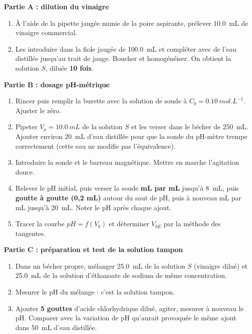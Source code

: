 \documentclass[11pt]{article}
\begin{document}
\textbf{Partie A : dilution du vinaigre}

\begin{enumerate}
\item À l'aide de la pipette jaugée munie de la poire aspirante, prélever \SI{10,0}{mL} de vinaigre commercial.
\item Les introduire dans la fiole jaugée de \SI{100,0}{mL} et compléter avec de l'eau distillée jusqu'au trait de jauge. Boucher et homogénéiser. On obtient la solution $S$, diluée \textbf{10 fois}.
\end{enumerate}

\textbf{Partie B : dosage pH-métrique}

\begin{enumerate}
\item Rincer puis remplir la burette avec la solution de soude à $C_b = \SI{0,10}{mol.L^{-1}}$. Ajuster le zéro.
\item Pipeter $V_a = \SI{10,0}{mL}$ de la solution $S$ et les verser dans le bécher de \SI{250}{mL}. Ajouter environ \SI{20}{mL} d'eau distillée pour que la sonde du pH-mètre trempe correctement (cette eau ne modifie pas l'équivalence).
\item Introduire la sonde et le barreau magnétique. Mettre en marche l'agitation douce.
\item Relever le pH initial, puis verser la soude \textbf{mL par mL} jusqu'à \SI{8}{mL}, puis \textbf{goutte à goutte (0,2 mL)} autour du saut de pH, puis à nouveau mL par mL jusqu'à \SI{20}{mL}. Noter le pH après chaque ajout.
\item Tracer la courbe $pH = f(V_b)$ et déterminer $V_{bE}$ par la méthode des tangentes.
\end{enumerate}

\textbf{Partie C : préparation et test de la solution tampon}

\begin{enumerate}
\item Dans un bécher propre, mélanger \SI{25,0}{mL} de la solution $S$ (vinaigre dilué) et \SI{25,0}{mL} de la solution d'éthanoate de sodium de même concentration.
\item Mesurer le pH du mélange : c'est la solution tampon.
\item Ajouter \textbf{5 gouttes} d'acide chlorhydrique dilué, agiter, mesurer à nouveau le pH. Comparer avec la variation de pH qu'aurait provoquée le même ajout dans \SI{50}{mL} d'eau distillée.
\end{enumerate}
\end{document}
